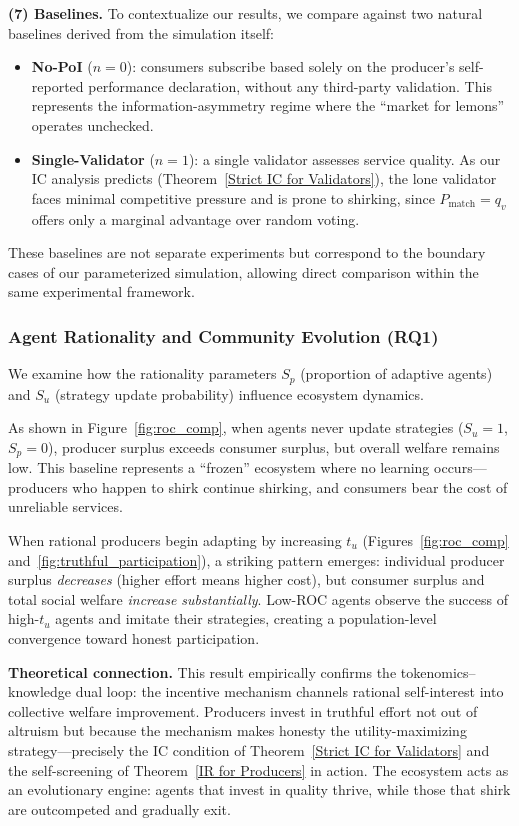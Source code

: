 \textbf{(7) Baselines.}
To contextualize our results, we compare against two natural baselines derived from the simulation itself:
\begin{itemize}
    \item \textbf{No-PoI} ($n = 0$): consumers subscribe based solely on the producer's self-reported performance declaration, without any third-party validation. This represents the information-asymmetry regime where the ``market for lemons'' operates unchecked.
    \item \textbf{Single-Validator} ($n = 1$): a single validator assesses service quality. As our IC analysis predicts (Theorem~\ref{Strict IC for Validators}), the lone validator faces minimal competitive pressure and is prone to shirking, since $P_{\text{match}} = q_v$ offers only a marginal advantage over random voting.
\end{itemize}
These baselines are not separate experiments but correspond to the boundary cases of our parameterized simulation, allowing direct comparison within the same experimental framework.

\subsubsection{Agent Rationality and Community Evolution (RQ1)}

We examine how the rationality parameters $S_p$ (proportion of adaptive agents) and $S_u$ (strategy update probability) influence ecosystem dynamics.

As shown in Figure~\ref{fig:roc_comp}, when agents never update strategies ($S_u = 1$, $S_p = 0$), producer surplus exceeds consumer surplus, but overall welfare remains low.
This baseline represents a ``frozen'' ecosystem where no learning occurs---producers who happen to shirk continue shirking, and consumers bear the cost of unreliable services.

When rational producers begin adapting by increasing $t_u$ (Figures~\ref{fig:roc_comp} and~\ref{fig:truthful_participation}), a striking pattern emerges:
individual producer surplus \textit{decreases} (higher effort means higher cost), but consumer surplus and total social welfare \textit{increase substantially}.
Low-ROC agents observe the success of high-$t_u$ agents and imitate their strategies, creating a population-level convergence toward honest participation.

\textbf{Theoretical connection.}
This result empirically confirms the tokenomics--knowledge dual loop: the incentive mechanism channels rational self-interest into collective welfare improvement.
Producers invest in truthful effort not out of altruism but because the mechanism makes honesty the utility-maximizing strategy---precisely the IC condition of Theorem~\ref{Strict IC for Validators} and the self-screening of Theorem~\ref{IR for Producers} in action.
The ecosystem acts as an evolutionary engine: agents that invest in quality thrive, while those that shirk are outcompeted and gradually exit.


